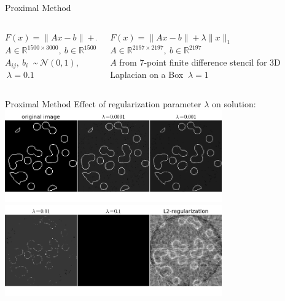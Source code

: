 \documentclass[10pt]{beamer}
\begin{document}
   \begin{frame}{Proximal Method}
   	\begin{columns}[T]
   		\begin{column}{.5\textwidth}
   			$F(x) = \lVert Ax - b \rVert + \lambda \lVert x \rVert_1$\\
   			$A \in \mathbb{R}^{1500 \times 3000},\:b \in \mathbb{R}^{1500}$\\
   			$A_{ij},\:b_i\:$ \textasciitilde $\:\mathcal{N}(0,1)$, $\:\lambda = 0.1$\\
   			\vspace{28pt}
   			\resizebox{\linewidth}{!}{}
   		\end{column}\hfill
   		\begin{column}{.5\textwidth}
   			$F(x) = \lVert Ax - b \rVert + \lambda \lVert x \rVert_1$\\
   			$A \in \mathbb{R}^{2197 \times 2197},\:b \in \mathbb{R}^{2197}$\\
   			$A$ from 7-point finite difference stencil for 3D Laplacian on a Box $\:\lambda = 1$\\
   			\vspace{10pt}
   			\resizebox{\linewidth}{!}{}
   		\end{column}
   	\end{columns}
   \end{frame}
   
   \begin{frame}{Proximal Method}
   	\alert{Effect of regularization parameter $\lambda$ on solution:}\\
   	\centering\includegraphics[width = 0.7\textwidth]{lambda1.png}\\
   	\centering\includegraphics[width = 0.7\textwidth]{lambda2.png}
   \end{frame}
\end{document}
